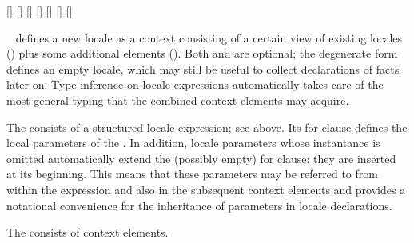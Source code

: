 \begin{isabellebody}
\begin{isamarkuptext}
\begin{railoutput}
\rail@endbar
{}[]
\rail@bar
{}
[]
\rail@endbar
{}
[]
\rail@endplus
{}
[]
\rail@plus
\rail@bar
{}
[]
\rail@endbar
{}[]
[]
\rail@endplus
\rail@endbar
\rail@end
\end{railoutput}


  \begin{description}
  
  \item \hyperlink{command.locale}{\mbox{}}~ defines a
  new locale  as a context consisting of a certain view of
  existing locales () plus some additional elements
  ().  Both  and  are optional;
  the degenerate form \hyperlink{command.locale}{\mbox{}}~ defines an empty
  locale, which may still be useful to collect declarations of facts
  later on.  Type-inference on locale expressions automatically takes
  care of the most general typing that the combined context elements
  may acquire.

  The  consists of a structured locale expression; see
   above.  Its for clause defines the local
  parameters of the .  In addition, locale parameters
  whose instantance is omitted automatically extend the (possibly
  empty) for clause: they are inserted at its beginning.  This means
  that these parameters may be referred to from within the expression
  and also in the subsequent context elements and provides a
  notational convenience for the inheritance of parameters in locale
  declarations.

  The  consists of context elements.

  \begin{description}


\end{description}
\end{description}
\end{isamarkuptext}
\end{isabellebody}
